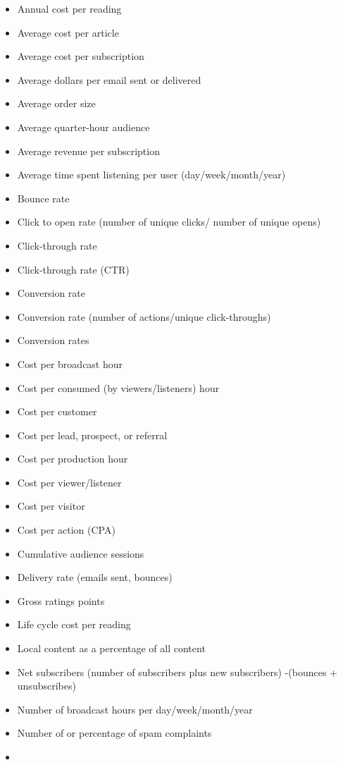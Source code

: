 \documentclass[]{book}
\providecommand{\tightlist}{%
  \setlength{\itemsep}{0pt}\setlength{\parskip}{0pt}}
\begin{document}
\begin{itemize}
\tightlist
\item
  Annual cost per reading
\item
  Average cost per article
\item
  Average cost per subscription
\item
  Average dollars per email sent or delivered
\item
  Average order size
\item
  Average quarter-hour audience
\item
  Average revenue per subscription
\item
  Average time spent listening per user (day/week/month/year)
\item
  Bounce rate
\item
  Click to open rate (number of unique clicks/ number of unique opens)
\item
  Click-through rate
\item
  Click-through rate (CTR)
\item
  Conversion rate
\item
  Conversion rate (number of actions/unique click-throughs)
\item
  Conversion rates
\item
  Cost per broadcast hour
\item
  Cost per consumed (by viewers/listeners) hour
\item
  Cost per customer
\item
  Cost per lead, prospect, or referral
\item
  Cost per production hour
\item
  Cost per viewer/listener
\item
  Cost per visitor
\item
  Cost per action (CPA)
\item
  Cumulative audience sessions
\item
  Delivery rate (emails sent, bounces)
\item
  Gross ratings points
\item
  Life cycle cost per reading
\item
  Local content as a percentage of all content
\item
  Net subscribers (number of subscribers plus new subscribers) -(bounces
  + unsubscribes)
\item
  Number of broadcast hours per day/week/month/year
\item
  Number of or percentage of spam complaints
\item

\end{itemize}
\end{document}
